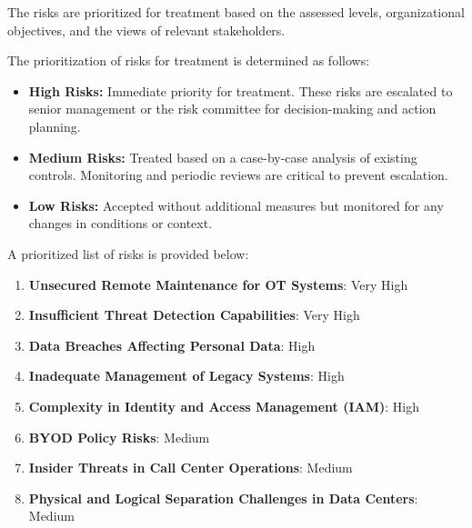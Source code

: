 The risks are prioritized for treatment based on the assessed levels, organizational objectives, and the views of relevant stakeholders.

The prioritization of risks for treatment is determined as follows:
\begin{itemize}
    \item \textbf{High Risks:} Immediate priority for treatment. These risks are escalated to senior management or the risk committee for decision-making and action planning.
    \item \textbf{Medium Risks:} Treated based on a case-by-case analysis of existing controls. Monitoring and periodic reviews are critical to prevent escalation.
    \item \textbf{Low Risks:} Accepted without additional measures but monitored for any changes in conditions or context.
\end{itemize}

A prioritized list of risks is provided below:
\begin{enumerate}
    \item \textbf{Unsecured Remote Maintenance for OT Systems}: Very High
    \item \textbf{Insufficient Threat Detection Capabilities}: Very High
    \item \textbf{Data Breaches Affecting Personal Data}: High
    \item \textbf{Inadequate Management of Legacy Systems}: High
    \item \textbf{Complexity in Identity and Access Management (IAM)}: High
    \item \textbf{BYOD Policy Risks}: Medium
    \item \textbf{Insider Threats in Call Center Operations}: Medium
    \item \textbf{Physical and Logical Separation Challenges in Data Centers}: Medium
\end{enumerate}